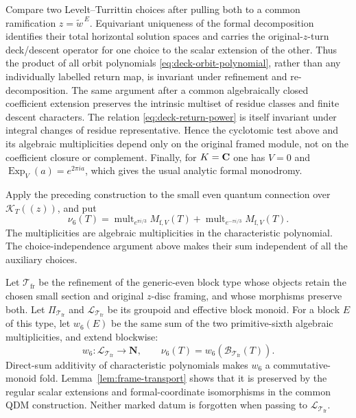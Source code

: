 Compare two Levelt--Turrittin choices after pulling both to
a common ramification \(z=\widetilde w^{\,E}\).  Equivariant uniqueness of the formal
decomposition identifies their total horizontal solution spaces and carries
the original-\(z\)-turn deck/descent operator for one choice to the scalar
extension of the other.  Thus the product of all orbit polynomials
\eqref{eq:deck-orbit-polynomial}, rather than any individually labelled
return map, is invariant under refinement and re-decomposition.  The same
argument after a common algebraically closed coefficient extension preserves
the intrinsic multiset of residue classes and finite descent characters.
The relation \eqref{eq:deck-return-power} is itself invariant under integral
changes of residue representative.  Hence the cyclotomic test above and its
algebraic multiplicities depend only on the original framed module, not on
the coefficient closure or complement.  Finally, for \(K=\mathbf C\) one has
\(V=0\) and
\(\operatorname{Exp}_V(a)=e^{2\pi i a}\), which gives the usual analytic
formal monodromy.

\begin{definition}
\label{def:framed-sixth-multiplicity}
%
%
Apply the preceding construction to the small even quantum connection over
\(\mathcal K_T((z))\), and put
\[
 \nu_6(T)=
 \operatorname{mult}_{e^{\pi i/3}}M_{\mathrm f,V}(T)+
 \operatorname{mult}_{e^{-\pi i/3}}M_{\mathrm f,V}(T).
\]
The multiplicities are algebraic multiplicities in the characteristic
polynomial.  The choice-independence argument above makes their sum independent
of all the auxiliary choices.
\end{definition}

Let \(\mathcal T_{\mathrm{fr}}\) be the refinement of the generic-even block
type whose objects retain the chosen small section and original \(z\)-disc
framing, and whose morphisms preserve both.  Let
\(\Pi_{\mathcal T_{\mathrm{fr}}}\) and
\(\mathcal L_{\mathcal T_{\mathrm{fr}}}\) be its groupoid and effective block
monoid.  For a block \(E\) of this type, let \(w_6(E)\) be the same sum of the
two primitive-sixth algebraic multiplicities, and extend blockwise:
\[
 w_6:\mathcal L_{\mathcal T_{\mathrm{fr}}}\longrightarrow\mathbf N,
 \qquad
 \nu_6(T)=w_6(\mathcal B_{\mathcal T_{\mathrm{fr}}}(T)).
 \label{eq:framed-fold}
\]
Direct-sum additivity of characteristic polynomials makes \(w_6\) a
commutative-monoid fold.  Lemma~\ref{lem:frame-transport} shows that it is
preserved by the regular scalar extensions and formal-coordinate isomorphisms
in the common QDM construction.  Neither marked datum is forgotten when passing to
\(\mathcal L_{\mathcal T_{\mathrm{fr}}}\).

